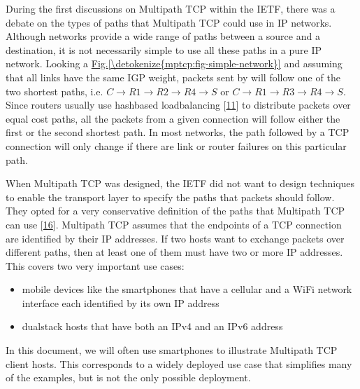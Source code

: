 \documentclass[letterpaper,10pt,english]{sphinxmanual}
\begin{document}
During the first discussions on Multipath TCP within the IETF, there was a debate on the types of paths that Multipath TCP could use in IP networks. Although networks provide a wide range of paths between a source and a destination, it is not necessarily simple to use all these paths in a pure IP network. Looking a \hyperref[\detokenize{mptcp:fig-simple-network}]{Fig.\@ \ref{\detokenize{mptcp:fig-simple-network}}} and assuming that all links have the same IGP weight, packets sent by  will follow one of the two shortest paths, i.e. \(C \rightarrow R1 \rightarrow R2 \rightarrow R4 \rightarrow S\) or \(C \rightarrow R1 \rightarrow R3 \rightarrow R4 \rightarrow S\). Since routers usually use hash\sphinxhyphen{}based load\sphinxhyphen{}balancing {[}\hyperlink{cite.biblio:id2922}{11}{]} to distribute packets over equal cost paths, all the packets from a given connection will follow either the first or the second shortest path. In most networks, the path followed by a TCP connection will only change if there are link or router failures on this particular path.

\sphinxAtStartPar
When Multipath TCP was designed, the IETF did not want to design techniques to enable the transport layer to specify the paths that packets should follow. They opted for a very conservative definition of the paths that Multipath TCP can use {[}\hyperlink{cite.biblio:id6033}{16}{]}. Multipath TCP assumes that the endpoints of a TCP connection are identified by their IP addresses. If two hosts want to exchange packets over different paths, then at least one of them must have two or more IP addresses. This covers two very important use cases:
\begin{itemize}
\item {} 
\sphinxAtStartPar
mobile devices like the smartphones that have a cellular and a Wi\sphinxhyphen{}Fi network interface each identified by its own IP address

\item {} 
\sphinxAtStartPar
dual\sphinxhyphen{}stack hosts that have both an IPv4 and an IPv6 address

\end{itemize}

\sphinxAtStartPar
In this document, we will often use smartphones to illustrate Multipath TCP client hosts. This corresponds to a widely deployed use case that simplifies many of the examples, but is not the only possible deployment.
\end{document}

